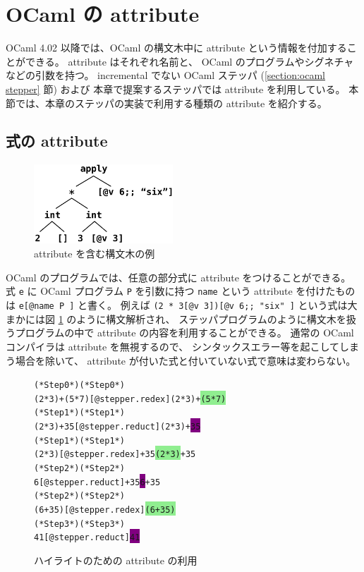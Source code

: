 \section{OCaml の attribute}
\label{OCamlのattribute}
OCaml 4.02 以降では、OCaml の構文木中に attribute
という情報を付加することができる。
attribute はそれぞれ名前と、
OCaml のプログラムやシグネチャなどの引数を持つ。
incremental でない OCaml ステッパ (\ref{section:ocaml stepper} 節) および
本章で提案するステッパでは attribute を利用している。
本節では、本章のステッパの実装で利用する種類の attribute を紹介する。

\subsection{式の attribute}
\label{OCamlのattribute-式のattribute}

\begin{figure}
  \begin{center}
    \includegraphics[width=5.2cm, height=3cm]{5/attribute.png}
  \end{center}
  \caption{attribute を含む構文木の例}
  \label{figure:attribute}
\end{figure}

OCaml のプログラムでは、任意の部分式に attribute をつけることができる。
式 \texttt{e} に OCaml プログラム \texttt{P} を引数に持つ
\texttt{name} という attribute を付けたものは \texttt{e[@name P ]} と書く。
例えば \texttt{(2 * 3[@v 3])[@v 6;; "six" ]} という式は大まかには図
\ref{figure:attribute} のように構文解析され、
ステッパプログラムのように構文木を扱うプログラムの中で
attribute の内容を利用することができる。
通常の OCaml コンパイラは attribute を無視するので、
シンタックスエラー等を起こしてしまう場合を除いて、
attribute が付いた式と付いていない式で意味は変わらない。

\begin{figure}
\begin{alltt}
  (* Step 0 *)                              (* Step 0 *)
  (2 * 3) + (5 * 7)[@stepper.redex ]        (2 * 3) + \colorbox{lightgreen}{(5 * 7)}
  (* Step 1 *)                              (* Step 1 *)
  (2 * 3) + 35[@stepper.reduct ]            (2 * 3) + \colorbox{purple}{35}
  (* Step 1 *)                              (* Step 1 *)
  (2 * 3)[@stepper.redex ] + 35             \colorbox{lightgreen}{(2 * 3)} + 35
  (* Step 2 *)                              (* Step 2 *)
  6[@stepper.reduct ] + 35                  \colorbox{purple}{6} + 35
  (* Step 2 *)                              (* Step 2 *)
  (6 + 35)[@stepper.redex ]                 \colorbox{lightgreen}{(6 + 35)}
  (* Step 3 *)                              (* Step 3 *)
  41[@stepper.reduct ]                      \colorbox{purple}{41}
\end{alltt}
\caption{ハイライトのための attribute の利用}
\label{figure:highlight}
\end{figure}

